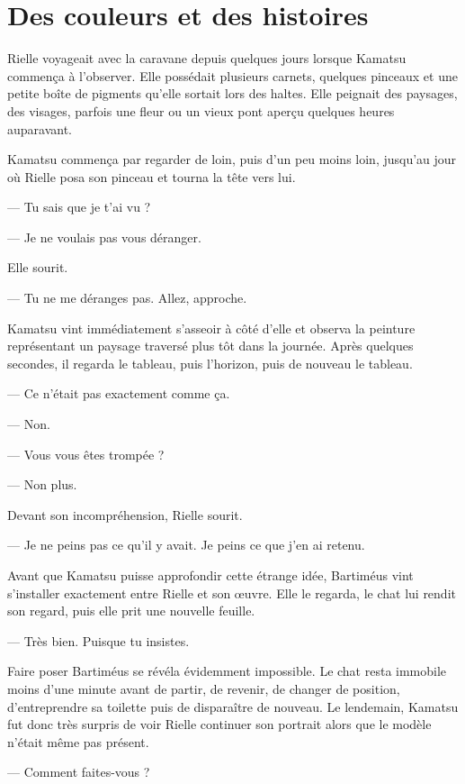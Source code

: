 \chapter{Des couleurs et des histoires}
\label{chap:des-couleurs-et-des-histoires}

Rielle voyageait avec la caravane depuis quelques jours lorsque Kamatsu
commença à l'observer. Elle possédait plusieurs carnets, quelques pinceaux et
une petite boîte de pigments qu'elle sortait lors des haltes. Elle peignait des
paysages, des visages, parfois une fleur ou un vieux pont aperçu quelques
heures auparavant.

Kamatsu commença par regarder de loin, puis d'un peu moins loin, jusqu'au jour
où Rielle posa son pinceau et tourna la tête vers lui.

— Tu sais que je t'ai vu ?

— Je ne voulais pas vous déranger.

Elle sourit.

— Tu ne me déranges pas. Allez, approche.

Kamatsu vint immédiatement s'asseoir à côté d'elle et observa la peinture
représentant un paysage traversé plus tôt dans la journée. Après quelques
secondes, il regarda le tableau, puis l'horizon, puis de nouveau le tableau.

— Ce n'était pas exactement comme ça.

— Non.

— Vous vous êtes trompée ?

— Non plus.

Devant son incompréhension, Rielle sourit.

— Je ne peins pas ce qu'il y avait. Je peins ce que j'en ai retenu.

Avant que Kamatsu puisse approfondir cette étrange idée, Bartiméus vint
s'installer exactement entre Rielle et son œuvre. Elle le regarda, le chat lui
rendit son regard, puis elle prit une nouvelle feuille.

— Très bien. Puisque tu insistes.

\scenebreak

Faire poser Bartiméus se révéla évidemment impossible. Le chat resta immobile
moins d'une minute avant de partir, de revenir, de changer de position,
d'entreprendre sa toilette puis de disparaître de nouveau. Le lendemain,
Kamatsu fut donc très surpris de voir Rielle continuer son portrait alors que
le modèle n'était même pas présent.

— Comment faites-vous ?

